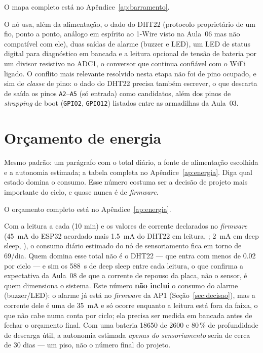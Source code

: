 O mapa completo está no Apêndice~\ref{ap:barramento}.

O nó usa, além da alimentação, o dado do DHT22 (protocolo
proprietário de um fio, ponto a ponto, análogo em espírito ao 1-Wire
visto na Aula~06 mas não compatível com ele), duas saídas de alarme
(buzzer e LED), um LED de status digital para diagnóstico em bancada
e a leitura opcional de tensão de bateria por um divisor resistivo no
ADC1, o conversor que continua confiável com o WiFi ligado. O conflito mais relevante
resolvido nesta etapa não foi de pino ocupado, e sim de \emph{classe}
de pino: o dado do DHT22 precisa também escrever, o que descarta de
saída os pinos \texttt{A2}--\texttt{A5} (só entrada) como candidatos,
além dos pinos de \emph{strapping} de boot (\texttt{GPIO2},
\texttt{GPIO12}) listados entre as armadilhas da Aula~03.

\section{Orçamento de energia}
\label{sec:energia}

\begin{orientacao}
Mesmo padrão: um parágrafo com o total diário, a fonte de alimentação
escolhida e a autonomia estimada; a tabela completa no
Apêndice~\ref{ap:energia}. Diga qual estado domina o consumo. Esse
número costuma ser a decisão de projeto mais importante do ciclo, e
quase nunca é de \emph{firmware}.
\end{orientacao}

O orçamento completo está no Apêndice~\ref{ap:energia}.

Com a leitura a cada  (10 min) e os valores de corrente
declarados no \emph{firmware} (\SI{45}{\milli\ampere} do ESP32 acordado
mais \SI{1,5}{\milli\ampere} do DHT22 em leitura, \folhadedados; \SI{2}{\milli\ampere} em deep sleep, \bancada), o
consumo diário estimado do nó de sensoriamento fica em torno de
\SI{69}{\mAh}/dia. Quem domina esse total não é o DHT22 --- que entra
com menos de \SI{0.02}{\mAh} por ciclo --- e sim os \SI{588}{\second}
de deep sleep entre cada leitura, o que confirma a expectativa da
Aula~08 de que a corrente de repouso da placa, não o sensor, é quem
dimensiona o sistema. Este número \textbf{não inclui} o consumo do
alarme (buzzer/LED): o alarme já está no \emph{firmware} da AP1
(Seção~\ref{sec:decisao}), mas a corrente dele é uma \estimativa{} de
\SI{35}{\milli\ampere} e só ocorre enquanto a leitura está fora da faixa,
o que não cabe numa conta por ciclo; ela precisa ser medida em bancada
antes de fechar o orçamento final. Com uma bateria 18650 de \SI{2600}{\mAh} e
80\,\% de profundidade de descarga útil, a autonomia estimada
\emph{apenas do sensoriamento} seria de cerca de 30 dias --- um piso,
não o número final do projeto.

